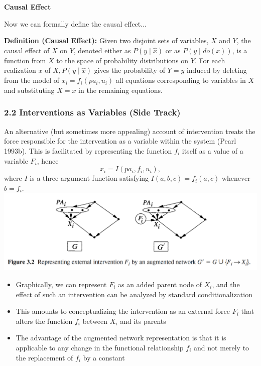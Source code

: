 \documentclass{beamer}
\begin{document}
\begin{frame}
\textbf{Causal Effect}

\vspace{0.2cm}
Now we can formally define the causal effect...
\vspace{0.2cm}

\textbf{Definition (Causal Effect):} Given two disjoint sets of variables, $X$ and $Y$, the causal effect of $X$ on $Y$, denoted either as $P(y \mid \hat{x})$ or as $P(y \mid d o(x))$, is a function from $X$ to the space of probability distributions on $Y$. For each realization $x$ of $X, P(y \mid \hat{x})$ gives the probability of $Y=y$ induced by deleting from the model of $x_i=f_i\left(p a_i, u_i\right)$ all equations corresponding to variables in $X$ and substituting $X=x$ in the remaining equations.
\end{frame}

\begin{frame}
\frametitle{2.2 Interventions as Variables (Side Track)}
An alternative (but sometimes more appealing) account of intervention treats the force responsible for the intervention as a variable within the system (Pearl 1993b). This is facilitated by representing the function $f_i$ itself as a value of a variable $F_i$, hence
$$
x_i=I\left(p a_i, f_i, u_i\right),
$$
where $I$ is a three-argument function satisfying $I(a, b, c)=f_i(a, c)$ whenever $b=f_i$.
\includegraphics[scale=0.37]{img/fig_2}
\end{frame}

\begin{frame}
\begin{itemize}
\item Graphically, we can represent $F_i$ as an added parent node of $X_i$, and the effect of such an intervention can be analyzed by standard conditionalization
\item This amounts to conceptualizing the intervention as an external force $F_i$ that alters the function $f_i$ between $X_i$ and its parents
\item The advantage of the augmented network representation is that it is applicable to any change in the functional relationship $f_i$ and not merely to the replacement of $f_i$ by a constant
\end{itemize}
\end{frame}
\end{document}
